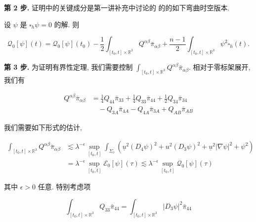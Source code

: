 \textbf{第 2 步.}  证明中的关键成分是第一讲补充中讨论的 的的如下弯曲时空版本. 

\begin{proposition}[广义共形恒等式]\label{prop:cG-3.17}
设 $\psi$ 是 $\square_h\psi = 0$ 的解. 则

\begin{equation}
\mathcal {Q} _ {0} [ \psi ] (t) = \mathcal {Q} _ {0} [ \psi ] (t _ {0}) - \frac {1}{2} \int_ {[ t _ {0},  t ] \times \mathbb {R} ^ {3}} Q ^ {\alpha \beta} \bar {\pi} _ {\alpha \beta} + \frac {n - 1}{2} \int_ {[ t _ {0},  t ] \times \mathbb {R} ^ {3}} \psi^ {2} \square_ {h} (t).\label{eq:cG-86}
\end{equation}
\end{proposition}

\textbf{第 3 步.} 为证明有界性定理, 我们需要控制 $\int_{[t_0, t] \times \mathbb{R}^3} Q^{\alpha\beta} \bar{\pi}_{\alpha\beta}$. 相对于零标架展开, 我们有

\[
\begin{aligned}
Q ^ {\alpha \beta} \bar {\pi} _ {\alpha \beta} &= \frac {1}{4} Q _ {4 4} \bar {\pi} _ {3 3} + \frac {1}{4} Q _ {3 3} \bar {\pi} _ {4 4} + \frac {1}{2} Q _ {3 4} \bar {\pi} _ {3 4} \\
&\quad - Q _ {3 A} \bar {\pi} _ {4 A} - Q _ {4 A} \bar {\pi} _ {3 A} + Q _ {A B} \bar {\pi} _ {A B}
\end{aligned}
\]

我们需要如下形式的估计, 

\[
\begin{aligned}
\int_ {[ t _ {0},  t ] \times \mathbb {R} ^ {3}} Q ^ {\alpha \beta} \bar {\pi} _ {\alpha \beta} &\lesssim \lambda^ {- \epsilon} \sup _ {[ t _ {0},  t ]} \int_ {\Sigma_ {\tau}} \left(\underline {u} ^ {2} (D _ {4} \psi) ^ {2} + u ^ {2} (D _ {3} \psi) ^ {2} + \underline {u} ^ {2} | \nabla \psi | ^ {2} + \psi^ {2}\right) \\
&= \lambda^ {- \epsilon} \sup _ {[ t _ {0},  t ]} \mathcal {E} _ {0} [ \psi ] (\tau) \lesssim \lambda^ {- \epsilon} \sup _ {[ t _ {0},  t ]} \mathcal {Q} _ {0} [ \psi ] (\tau)
\end{aligned}
\]

其中 $\epsilon > 0$ 任意. 特别考虑项

\[
\int_ {[ t _ {0},  t ] \times \mathbb {R} ^ {3}} Q _ {3 3} \bar {\pi} _ {4 4} = \int_ {[ t _ {0},  t ] \times \mathbb {R} ^ {3}} | D _ {3} \psi | ^ {2} \bar {\pi} _ {4 4}
\]

